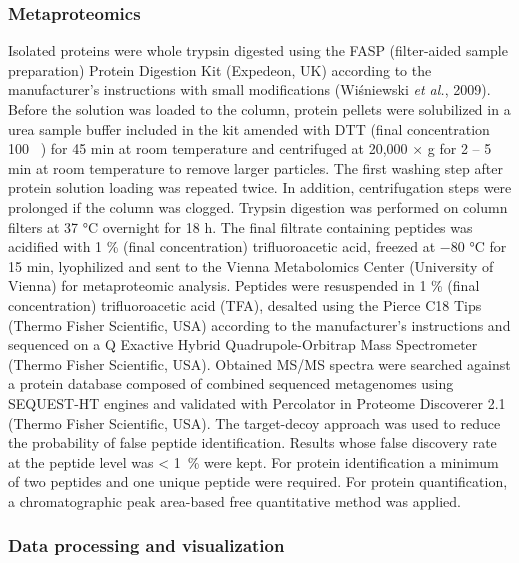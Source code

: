 \documentclass[12pt,]{article}
\begin{document}
\hypertarget{metaproteomics}{%
\subsubsection{Metaproteomics}\label{metaproteomics}}

Isolated proteins were whole trypsin digested using the FASP
(filter-aided sample preparation) Protein Digestion Kit (Expedeon, UK)
according to the manufacturer's instructions with small modifications
(Wiśniewski \emph{et al.}, 2009). Before the solution was loaded to the
column, protein pellets were solubilized in a urea sample buffer
included in the kit amended with DTT (final concentration 100
\si{\milli\Molar}) for 45 \si{\minute} at room temperature and
centrifuged at 20,000 × g for 2 -- 5 \si{\minute} at room temperature to
remove larger particles. The first washing step after protein solution
loading was repeated twice. In addition, centrifugation steps were
prolonged if the column was clogged. Trypsin digestion was performed on
column filters at 37 \si{\degreeCelsius} overnight for 18 \si{\hour}.
The final filtrate containing peptides was acidified with 1
\si{\percent} (final concentration) trifluoroacetic acid, freezed at
\num{-80} \si{\degreeCelsius} for 15 \si{\minute}, lyophilized and sent
to the Vienna Metabolomics Center (University of Vienna) for
metaproteomic analysis. Peptides were resuspended in 1 \si{\percent}
(final concentration) trifluoroacetic acid (TFA), desalted using the
Pierce C18 Tips (Thermo Fisher Scientific, USA) according to the
manufacturer's instructions and sequenced on a Q Exactive Hybrid
Quadrupole-Orbitrap Mass Spectrometer (Thermo Fisher Scientific, USA).
Obtained MS/MS spectra were searched against a protein database composed
of combined sequenced metagenomes using SEQUEST-HT engines and validated
with Percolator in Proteome Discoverer 2.1 (Thermo Fisher Scientific,
USA). The target-decoy approach was used to reduce the probability of
false peptide identification. Results whose false discovery rate at the
peptide level was \SI{< 1}{\percent} were kept. For protein
identification a minimum of two peptides and one unique peptide were
required. For protein quantification, a chromatographic peak area-based
free quantitative method was applied.

\hypertarget{data-processing-and-visualization}{%
\subsubsection{Data processing and
visualization}\label{data-processing-and-visualization}}
\end{document}
